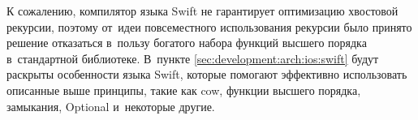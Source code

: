 К сожалению, компилятор языка Swift не гарантирует оптимизацию хвостовой рекурсии, поэтому от~идеи повсеместного использования рекурсии было принято решение отказаться в~пользу богатого набора функций высшего порядка в~стандартной библиотеке. В~пункте \ref{sec:development:arch:ios:swift} будут раскрыты особенности языка Swift, которые помогают эффективно использовать описанные выше принципы, такие как \gls{cow}, функции высшего порядка, замыкания, Optional и~некоторые другие\cite{functional-swift}.